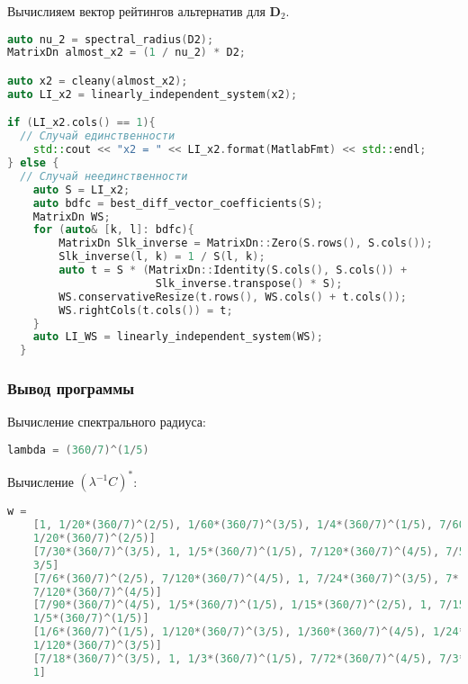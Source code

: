 \documentclass[specialist,
	substylefile = spbu_report.rtx,
	subf,href,colorlinks=true, 12pt]{disser}
\begin{document}
Вычислияем вектор рейтингов альтернатив для $\mathbf{D}_2$.
\begin{lstlisting}[language=c++,basicstyle=\footnotesize\ttfamily]
auto nu_2 = spectral_radius(D2);
MatrixDn almost_x2 = (1 / nu_2) * D2;

auto x2 = cleany(almost_x2);
auto LI_x2 = linearly_independent_system(x2);

if (LI_x2.cols() == 1){
  // Случай единственности
    std::cout << "x2 = " << LI_x2.format(MatlabFmt) << std::endl;
} else {
  // Случай неединственности
    auto S = LI_x2;
    auto bdfc = best_diff_vector_coefficients(S);
    MatrixDn WS;
    for (auto& [k, l]: bdfc){
        MatrixDn Slk_inverse = MatrixDn::Zero(S.rows(), S.cols());
        Slk_inverse(l, k) = 1 / S(l, k);
        auto t = S * (MatrixDn::Identity(S.cols(), S.cols()) +
                       Slk_inverse.transpose() * S);
        WS.conservativeResize(t.rows(), WS.cols() + t.cols());
        WS.rightCols(t.cols()) = t;
    }
    auto LI_WS = linearly_independent_system(WS);
  }
\end{lstlisting}

\subsubsection{Вывод программы}

Вычисление  спектрального радиуса:
\begin{lstlisting}[language=c++,basicstyle=\footnotesize\ttfamily]
	lambda = (360/7)^(1/5)
\end{lstlisting}

Вычисление $(\lambda^{-1}C)^*$:
\begin{lstlisting}[language=c++,basicstyle=\scriptsize\ttfamily]
	w = 
	[1, 1/20*(360/7)^(2/5), 1/60*(360/7)^(3/5), 1/4*(360/7)^(1/5), 7/60*(360/7)^(4/5), 
	1/20*(360/7)^(2/5)]
	[7/30*(360/7)^(3/5), 1, 1/5*(360/7)^(1/5), 7/120*(360/7)^(4/5), 7/5*(360/7)^(2/5), 
	3/5]
	[7/6*(360/7)^(2/5), 7/120*(360/7)^(4/5), 1, 7/24*(360/7)^(3/5), 7*(360/7)^(1/5), 
	7/120*(360/7)^(4/5)]
	[7/90*(360/7)^(4/5), 1/5*(360/7)^(1/5), 1/15*(360/7)^(2/5), 1, 7/15*(360/7)^(3/5), 
	1/5*(360/7)^(1/5)]
	[1/6*(360/7)^(1/5), 1/120*(360/7)^(3/5), 1/360*(360/7)^(4/5), 1/24*(360/7)^(2/5), 1, 
	1/120*(360/7)^(3/5)]
	[7/18*(360/7)^(3/5), 1, 1/3*(360/7)^(1/5), 7/72*(360/7)^(4/5), 7/3*(360/7)^(2/5), 
	1]
\end{lstlisting}
\end{document}
